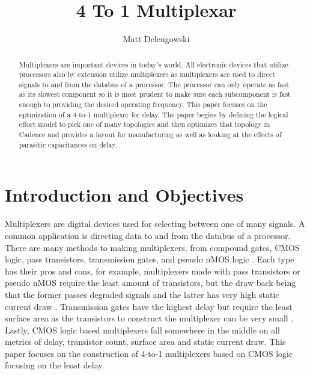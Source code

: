 \documentclass[conference]{IEEEtran}
\begin{document}
\title{4 To 1 Multiplexar}
\author{
Matt Delengowski\\
}
\maketitle

\IEEEpeerreviewmaketitle

\begin{abstract}
Multiplexers are important devices in today's world. All electronic devices that utilize processors also by extension utilize multiplexers as multiplexers are used to direct signals to and from the databus of a processor. The processor can only operate as fast as its slowest component so it is most prudent to make sure each subcomponent is fast enough to providing the desired operating frequency. This paper focuses on the optmization of a 4-to-1 multiplexer for delay. The paper begins by defining the logical effort model to pick one of many topologies and then optimizes that topology in Cadence and provides a layout for manufacturing as well as looking at the effects of parasitic capacitances on delay. 
\end{abstract}

\section{Introduction and Objectives}
\label{sec:Intro}
Multiplexers are digital devices used for selecting between one of many signals. A common application is directing data to and from the databus of a processor. There are many methods to making multiplexers, from compound gates, CMOS logic, pass transistors, transmission gates, and pseudo nMOS logic \cite{weste_harris_2011}. Each type has their pros and cons, for example, multiplexers made with pass transistors or pseudo nMOS require the least amount of transistors, but the draw back being that the former passes degraded signals and the latter has very high static current draw \cite{weste_harris_2011}. Transmission gates have the highest delay but require the least surface area as the transistors to construct the multiplexer can be very small \cite{weste_harris_2011}. Lastly, CMOS logic based multiplexers fall somewhere in the middle on all metrics of delay, transistor count, surface area and static current draw. This paper focuses on the construction of 4-to-1 multiplexers based on CMOS logic focusing on the least delay.    
\end{document}
